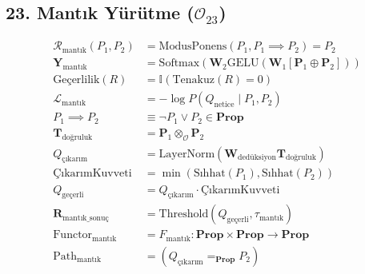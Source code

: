 \documentclass[11pt, a4paper]{article}
\begin{document}
\subsection{23. Mantık Yürütme ($\mathcal{O}_{23}$)}
\begin{align}
\mathcal{R}_{\text{mantık}}(P_1, P_2) &= \text{ModusPonens}(P_1, P_1 \implies P_2) = P_2 \\
\mathbf{Y}_{\text{mantık}} &= \text{Softmax}\left( \mathbf{W}_2 \text{GELU}(\mathbf{W}_1 [\mathbf{P}_1 \oplus \mathbf{P}_2]) \right) \\
\text{Geçerlilik}(R) &= \mathbb{I}(\text{Tenakuz}(R) = 0) \\
\mathcal{L}_{\text{mantık}} &= -\log P(Q_{\text{netice}} \mid P_1, P_2) \\
P_1 \implies P_2 &\equiv \neg P_1 \lor P_2 \in \mathbf{Prop} \\
\mathbf{T}_{\text{doğruluk}} &= \mathbf{P}_1 \otimes_{\mathcal{O}} \mathbf{P}_2 \\
Q_{\text{çıkarım}} &= \text{LayerNorm}(\mathbf{W}_{\text{dedüksiyon}} \mathbf{T}_{\text{doğruluk}}) \\
\text{ÇıkarımKuvveti} &= \min(\text{Sıhhat}(P_1), \text{Sıhhat}(P_2)) \\
Q_{\text{geçerli}} &= Q_{\text{çıkarım}} \cdot \text{ÇıkarımKuvveti} \\
\mathbf{R}_{\text{mantık\_sonuç}} &= \text{Threshold}(Q_{\text{geçerli}}, \tau_{\text{mantık}}) \\
\text{Functor}_{\text{mantık}} &= F_{\text{mantık}} : \mathbf{Prop} \times \mathbf{Prop} \to \mathbf{Prop} \\
\text{Path}_{\text{mantık}} &= (Q_{\text{çıkarım}} =_{\mathbf{Prop}} P_2)
\end{align}
\end{document}
